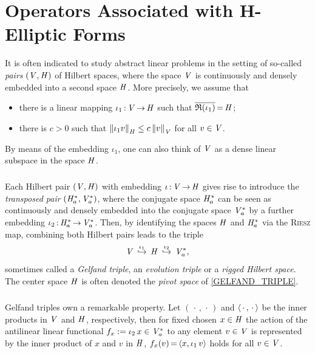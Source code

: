 \documentclass[11pt,twoside]{article}
\begin{document}
\section{Operators Associated with H-Elliptic Forms}                           %
It is often indicated to study abstract linear problems
in the setting of so-called \textit{pairs} $(\mathit{V},\mathit{H})$ of Hilbert spaces,
where the space $\mathit{V}$ is continuously and densely embedded
into a second space $\mathit{H}$.
More precisely,
we assume that

\begin{itemize}[leftmargin=9mm]
\item[(T-1)]
there is a linear mapping $\iota_1{\,:\,}\mathit{V} {\,\to\,} \mathit{H}$
such that $\overline{\mathfrak{R}(\iota_1) }  {\,=\,} \mathit{H}$;

\item[(T-2)]
there is $c>0$ such that
$\left\lVert \iota_1 v \right\rVert_{\mathit{H}} \leq c \left\lVert v \right\rVert_{\mathit{V}}$ for all $v \in \mathit{V}$.
\end{itemize}

By means of the embedding $\iota_1$,
one can also think of $\mathit{V}$ as a dense linear subspace in the space $\mathit{H}$.

\subparagraph*{} %
Each Hilbert pair $(\mathit{V},\mathit{H})$ with embedding $\iota{\,:\,}\mathit{V} {\,\to\,} \mathit{H}$
gives rise to introduce the \textit{transposed pair} $(\mathit{H}_a^*,\mathit{V}_a^*)$,
where the conjugate space $\mathit{H}_a^*$
can be seen as continuously and densely embedded
into the conjugate space $\mathit{V}_a^*$
by a further embedding $\iota_2{\,:\,}\mathit{H}_a^* {\,\to\,} \mathit{V}_a^*$.
Then,
by identifying the spaces $\mathit{H}$ and $\mathit{H}_a^*$ via the \textsc{Riesz} map,
combining both Hilbert pairs leads to the triple
\begin{equation}\label{GELFAND_TRIPLE}
\mathit{V} \, \overset{\iota_1}{\hookrightarrow} \,
\mathit{H} \, \overset{\iota_2}{\hookrightarrow} \, \mathit{V}_a^*,
\end{equation}
sometimes called a \textit{Gelfand triple},
an \textit{evolution triple} or a \textit{rigged Hilbert space}.
The center space $\mathit{H}$ is often denoted
the \textit{pivot space} of \eqref{GELFAND_TRIPLE}.

\subparagraph*{}
Gelfand triples own a remarkable property.
Let $(\,\cdot\,,\,\cdot\,)$ and $\langle \,\cdot\,,\,\cdot\, \rangle$
be the inner products in $\mathit{V}$ and $\mathit{H}$,
respectively,
then for fixed chosen $x \in \mathit{H}$
the action of the antilinear linear functional
$f_x := \iota_2 \, x \in \mathit{V}_a^*$ to any element $v \in \mathit{V}$
is represented by the inner product of $x$ and $v$ in $\mathit{H}$,
{\ie} $f_x(v) {\,=\,} \langle x,\iota_1 \, v \rangle$ holds for all $v \in \mathit{V}$.
\end{document}
